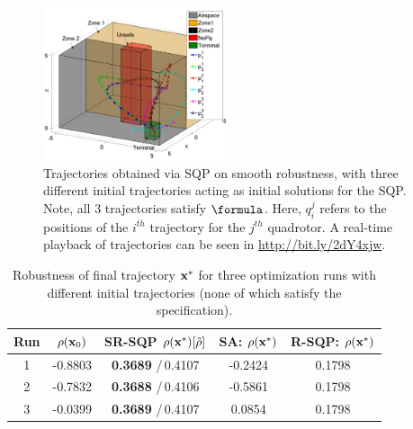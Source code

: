 

\begin{figure}[t]
\centering
\includegraphics[width=0.49\textwidth]{figures/QuadTrajs_u_scissored}
\vspace{-10pt}
\caption{{\small Trajectories obtained via SQP on smooth robustness, with three different initial trajectories acting as initial solutions for the SQP. Note, all 3 trajectories satisfy $\formula$. Here, $q_{i}^j$ refers to the positions of the $i^{th}$ trajectory for the $j^{th}$ quadrotor. 
A real-time playback of trajectories can be seen in \protect\url{http://bit.ly/2dY4xjw}.}}
\vspace{-10pt}
\label{fig:quad_ssqp}
\end{figure}


%
\begin{table}[htb]
\small
\begin{center}
\caption{{\small Robustness of final trajectory $\mathbf{x}^*$ for three optimization runs with different initial trajectories (none of which satisfy the specification).}}
\vspace{-10pt}
\label{tbl:opt_performance}
\begin{tabular} {|c|c|c|c|c|}
	\hline
	\textbf{Run} & $\rho(\mathbf{x}_0) $ &SR-SQP $\rho(\mathbf{x}^*) [\tilde{\rho}]$ & SA: $\rho(\mathbf{x}^*)$ & R-SQP: $\rho(\mathbf{x}^*)$\\ \hline
	1 & -0.8803 & \textbf{0.3689} /\,0.4107 & -0.2424 & 0.1798 \\ \hline
	2 & -0.7832 & \textbf{0.3688} /\,0.4106 & -0.5861 & 0.1798 \\ \hline
	3 & -0.0399 & \textbf{0.3689} /\,0.4107 & 0.0854 & 0.1798 \\ \hline
\end{tabular}	
\end{center}
\vspace{-20pt}
\end{table}


